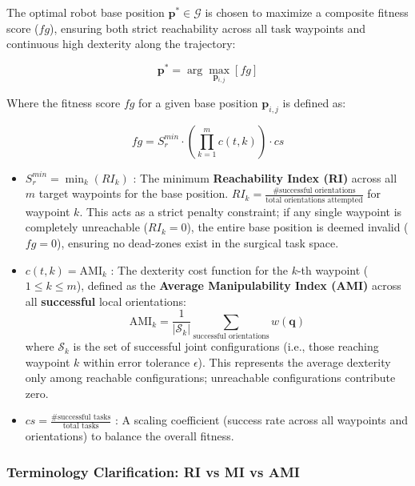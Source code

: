 \documentclass[a4paper,11pt]{article}
\begin{document}
The optimal robot base position $\mathbf{p}^* \in \mathcal{G}$ is chosen to maximize a composite fitness score ($fg$), ensuring both strict reachability across all task waypoints and continuous high dexterity along the trajectory:

\begin{equation}
    \mathbf{p}^* = \arg\max_{\mathbf{p}_{i,j}} \left[ fg \right]
\end{equation}

Where the fitness score $fg$ for a given base position $\mathbf{p}_{i,j}$ is defined as:

\begin{equation}
    fg = S_r^{min} \cdot \left( \prod_{k=1}^{m} c(t, k) \right) \cdot cs
\end{equation}

\begin{itemize}
    \item $S_r^{min} = \min_{k} (RI_k)$ : The minimum \textbf{Reachability Index (RI)} across all $m$ target waypoints for the base position. $RI_k = \frac{\text{\# successful orientations}}{\text{total orientations attempted}}$ for waypoint $k$. This acts as a strict penalty constraint; if any single waypoint is completely unreachable ($RI_k = 0$), the entire base position is deemed invalid ($fg = 0$), ensuring no dead-zones exist in the surgical task space.
    
    \item $c(t, k) = \text{AMI}_k$ : The dexterity cost function for the $k$-th waypoint ($1 \le k \le m$), defined as the \textbf{Average Manipulability Index (AMI)} across all \textbf{successful} local orientations:
    \begin{equation}
        \text{AMI}_k = \frac{1}{|\mathcal{S}_k|} \sum_{\text{successful orientations}} w(\mathbf{q})
    \end{equation}
    where $\mathcal{S}_k$ is the set of successful joint configurations (i.e., those reaching waypoint $k$ within error tolerance $\epsilon$). This represents the average dexterity only among reachable configurations; unreachable configurations contribute zero.
    
    \item $cs = \frac{\text{\# successful tasks}}{\text{total tasks}}$ : A scaling coefficient (success rate across all waypoints and orientations) to balance the overall fitness.
\end{itemize}

\subsubsection{Terminology Clarification: RI vs MI vs AMI}
\end{document}
